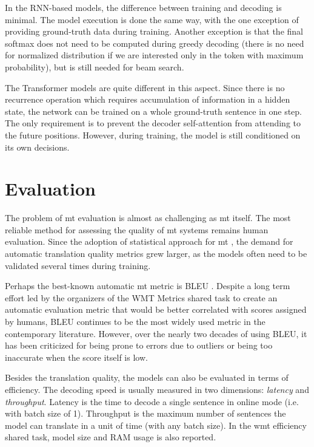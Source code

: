 In the RNN-based models, the difference between training and decoding is
minimal. The model execution is done the same way, with the one exception of
providing ground-truth data during training. Another exception is that the final
softmax does not need to be computed during greedy decoding (there is no need
for normalized distribution if we are interested only in the token with maximum
probability), but is still needed for beam search.

The Transformer models are quite different in this aspect. Since there is no
recurrence operation which requires accumulation of information in a hidden
state, the network can be trained on a whole ground-truth sentence in one step.
The only requirement is to prevent the decoder self-attention from attending to
the future positions. However, during training, the model is still conditioned
on its own decisions. 




\section{Evaluation}
\label{sec:evaluation}

The problem of \gls{mt} evaluation is almost as challenging as \gls{mt} itself.
The most reliable method for assessing the quality of \gls{mt} systems remains
human evaluation.  Since the adoption of statistical approach for \gls{mt}
\citep{brown-etal-1993-mathematics,koehn-etal-2003-statistical}, the demand for
automatic translation quality metrics grew larger, as the models often need to
be validated several times during training.

Perhaps the best-known automatic \gls{mt} metric is BLEU
\citep{papineni2002bleu}.  Despite a long term effort led by the organizers of
the WMT Metrics shared task to create an automatic evaluation metric that would
be better correlated with scores assigned by humans, BLEU continues to be the
most widely used metric in the contemporary literature. However, over the nearly
two decades of using BLEU, it has been criticized for being prone to errors due
to outliers or being too inaccurate when the score itself is low.
\citep{callison-burch-etal-2006-evaluating,bojar-etal-2010-tackling,reiter2018structured,mathur-etal-2020-tangled}

Besides the translation quality, the models can also be evaluated in terms of
efficiency. The decoding speed is usually measured in two dimensions:
\emph{latency} and \emph{throughput}. Latency is the time to decode a single
sentence in online mode (i.e. with batch size of 1). Throughput is the maximum
number of sentences the model can translate in a unit of time (with any batch
size). In the \gls{wmt} efficiency shared task, model size and RAM usage is
also reported.



